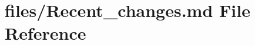 \hypertarget{Recent__changes_8md}{}\section{files/\+Recent\+\_\+changes.md File Reference}
\label{Recent__changes_8md}
